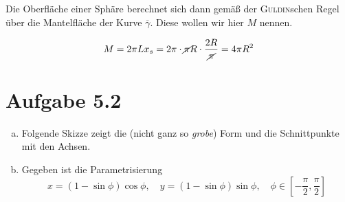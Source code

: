 \documentclass[a4paper,german,12pt,smallheadings]{scrartcl}
\begin{document}
Die Oberfläche einer Sphäre berechnet sich dann gemäß der \textsc{Guldin}schen
Regel über die Mantelfläche der Kurve $\overline{\gamma}$. Diese wollen wir
hier $M$ nennen.

\begin{equation*}
  M = 2 \pi L x_s = 2 \pi \cdot \cancel{\pi} R \cdot \frac{2R}{\cancel{\pi}} = 4 \pi R^2
\end{equation*}

\section*{Aufgabe 5.2}
\begin{enumerate}[a)]
  \item
    Folgende Skizze zeigt die (nicht ganz so \textit{grobe}) Form und die
    Schnittpunkte mit den Achsen.

    \begin{figure*}[h]
    \end{figure*}
  \item
    Gegeben ist die Parametrisierung
    \begin{equation*}
      x = (1 - \sin \phi)\cos \phi,\quad y = (1-\sin \phi)\sin \phi, \quad \phi \in [-\frac{\pi}{2},\frac{\pi}{2}]
    \end{equation*}


\end{enumerate}
\end{document}
